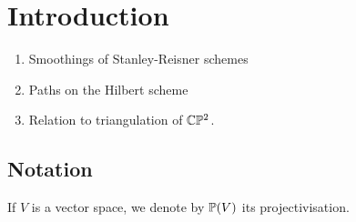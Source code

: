\chapter{Introduction}
\label{sec:intro}

\begin{enumerate}
    \item Smoothings of Stanley-Reisner schemes
    \item Paths on the Hilbert scheme
    \item Relation to triangulation of $\C \P^2$.
\end{enumerate}


\listoftodos[Notes]

\section{Notation}

If $V$ is a vector space, we denote by $\P(V)$ its projectivisation.